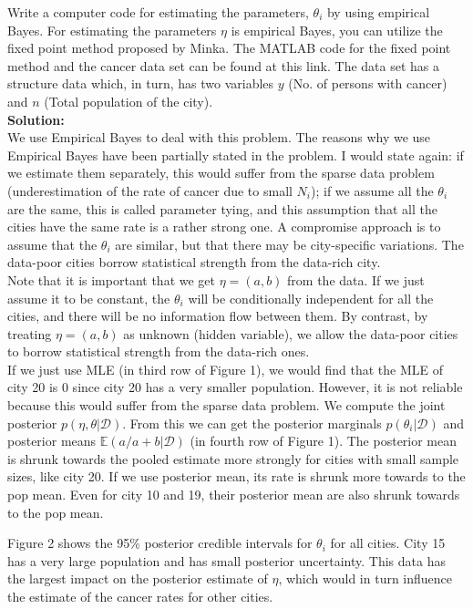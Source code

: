 \documentclass{article}
\begin{document}
Write a computer code for estimating the parameters, $\theta_{i}$ by using empirical Bayes. For estimating the parameters $\eta$ is empirical Bayes, you can utilize the fixed point method proposed by Minka. The MATLAB code for the fixed point method and the cancer data set can be found at this link. The data set has a structure data which, in turn, has two variables $y$ (No. of persons with cancer) and $n$ (Total population of the city). \\
\textbf{Solution:} \\
We use Empirical Bayes to deal with this problem. The reasons why we use Empirical Bayes have been partially stated in the problem. I would state again: if we estimate them separately, this would suffer from the sparse data problem (underestimation of the rate of cancer due to small $N_i$); if we assume all the $\theta_{i}$ are the same, this is called parameter tying, and this assumption that all the cities have the same rate is a rather strong one. A compromise approach is to assume that the $\theta_{i}$ are similar, but that there may be city-specific variations. The data-poor cities borrow statistical strength from the data-rich city.\\
Note that it is important that we get $\eta=(a,b)$ from the data. If we just assume it to be constant, the $\theta_{i}$ will be conditionally independent for all the cities, and there will be no information flow between them. By contrast, by treating $\eta=(a,b)$ as unknown (hidden variable), we allow  the data-poor cities to borrow statistical strength from the data-rich ones.\\
If we just use MLE (in third row of Figure 1), we would find that the MLE of  city 20 is 0 since city 20 has a very smaller population. However, it is not reliable because this would suffer from the sparse data problem.
We compute the joint posterior $p(\eta,\theta|\mathcal{D})$. From this we can get the posterior marginals $p(\theta_{i}|\mathcal{D})$ and posterior means $\mathbb{E}(a/a+b|\mathcal{D})$ (in fourth row of Figure 1). The posterior mean is shrunk towards the pooled estimate more strongly for cities with small sample sizes, like city 20. If we use posterior mean, its rate is shrunk more towards to the pop mean. Even for city 10 and 19, their posterior mean are also shrunk towards to the pop mean.

Figure 2 shows the 95\% posterior credible intervals for $\theta_{i}$ for all cities. City 15 has a very large population and has small posterior uncertainty. This data has the largest impact on the posterior estimate of $\eta$, which would in turn influence the estimate of the cancer rates for other cities. 
\end{document}
